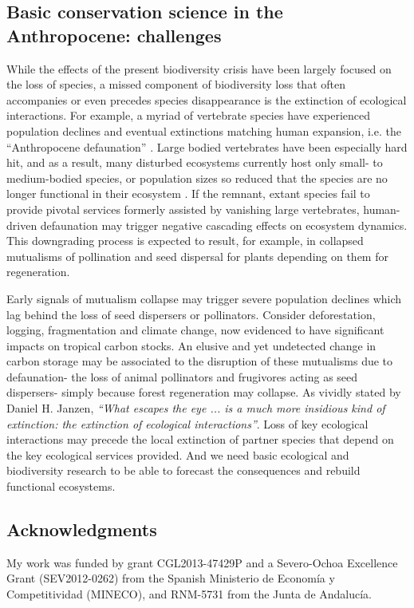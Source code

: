 \documentclass[10pt,letterpaper]{article}
\begin{document}
\subsection*{Basic conservation science in the Anthropocene: challenges}
While the effects of the present biodiversity crisis have been largely focused on the loss of species, a missed component of biodiversity loss that often accompanies or even precedes species disappearance is the extinction of ecological interactions. For example, a myriad of vertebrate species have experienced population declines and eventual extinctions matching human expansion, i.e. the “Anthropocene defaunation” \cite{Dirzo:2014}. Large bodied vertebrates have been especially hard hit, and as a result, many disturbed ecosystems currently host only small- to medium-bodied species, or population sizes so reduced that the species are no longer functional in their ecosystem \cite{Redford:1992}. If the remnant, extant species fail to provide pivotal services formerly assisted by vanishing large vertebrates, human-driven defaunation may trigger negative cascading effects on ecosystem dynamics. This downgrading process is expected to result, for example, in collapsed mutualisms of pollination and seed dispersal for plants depending on them for regeneration.

Early signals of mutualism collapse may trigger severe population declines which lag behind the loss of seed dispersers or pollinators. Consider deforestation, logging, fragmentation and climate change, now evidenced to have significant impacts on tropical carbon stocks. An elusive and yet undetected change in carbon storage may be associated to the disruption of these mutualisms due to defaunation- the loss of animal pollinators and frugivores acting as seed dispersers- simply because forest regeneration may collapse. As vividly stated by Daniel H. Janzen, \textit{“What escapes the eye ... is a much more insidious kind of extinction: the extinction of ecological interactions”}. Loss of key ecological interactions may precede the local extinction of partner species that depend on the key ecological services provided. And we need basic ecological and biodiversity research to be able to forecast the consequences and rebuild functional ecosystems.

\subsection*{Acknowledgments}
My work was funded by grant CGL2013-47429P and a Severo-Ochoa Excellence Grant (SEV2012-0262) from the Spanish Ministerio de Econom\'ia y Competitividad (MINECO), and RNM-5731 from the Junta de Andaluc\'ia. 
\end{document}
